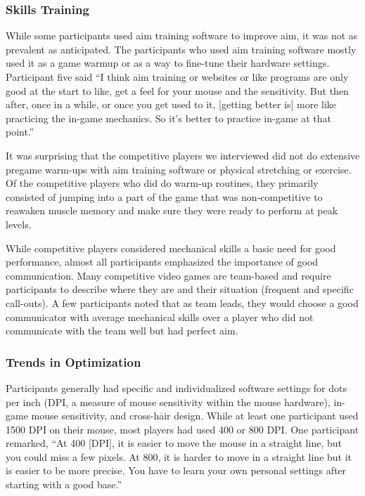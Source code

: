 \documentclass[11pt,manuscript,screen,review]{acmart} %
\begin{document}
\subsubsection{Skills Training}

While some participants used aim training software to improve aim, it was not as prevalent as anticipated. The participants who used aim training software mostly used it as a game warmup or as a way to fine-tune their hardware settings. Participant five said “I think aim training or websites or like programs are only good at the start to like, get a feel for your mouse and the sensitivity. But then after, once in a while, or once you get used to it, [getting better is] more like practicing the in-game mechanics. So it's better to practice in-game at that point.” 

It was surprising that the competitive players we interviewed did not do extensive pregame warm-ups with aim training software or physical stretching or exercise. Of the competitive players who did do warm-up routines, they primarily consisted of jumping into a part of the game that was non-competitive to reawaken muscle memory and make sure they were ready to perform at peak levels.

While competitive players considered mechanical skills a basic need for good performance, almost all participants emphasized the importance of good communication. Many competitive video games are team-based and require participants to describe where they are and their situation (frequent and specific call-outs). A few participants noted that as team leads, they would choose a good communicator with average mechanical skills over a player who did not communicate with the team well but had perfect aim.

\subsubsection{Trends in Optimization}

Participants generally had specific and individualized software settings for dots per inch (DPI, a measure of mouse sensitivity within the mouse hardware), in-game mouse sensitivity, and cross-hair design. While at least one participant used 1500 DPI on their mouse, most players had used 400 or 800 DPI. One participant remarked, “At 400 [DPI], it is easier to move the mouse in a straight line, but you could miss a few pixels. At 800, it is harder to move in a straight line but it is easier to be more precise. You have to learn your own personal settings after starting with a good base.” 
\end{document}
